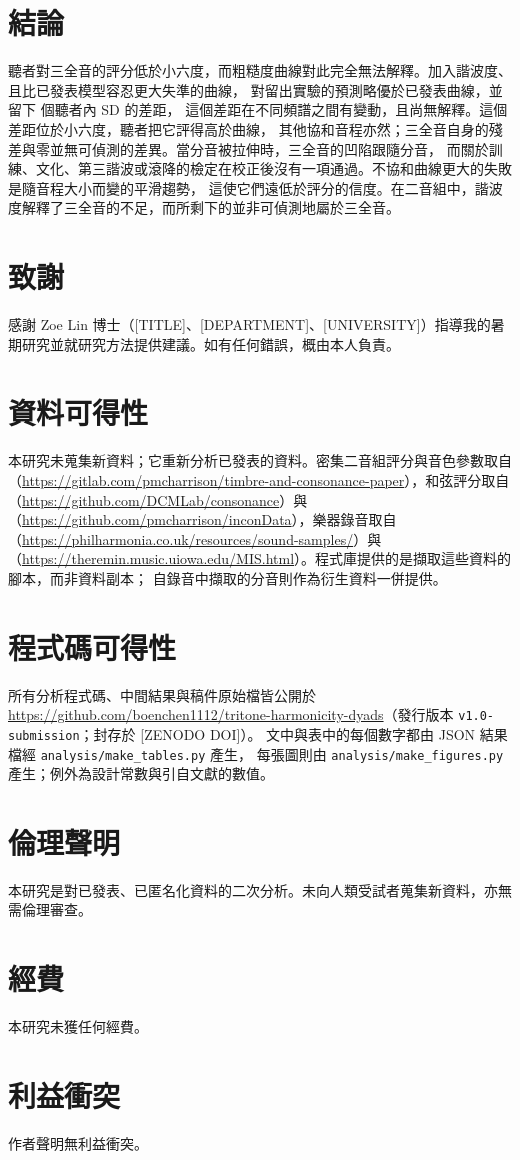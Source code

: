 \documentclass[11pt,a4paper]{article}
\begin{document}
\section{結論}
聽者對三全音的評分低於小六度，而粗糙度曲線對此完全無法解釋。加入諧波度、且比已發表模型容忍更大失準的曲線，
對留出實驗的預測略優於已發表曲線，並留下 \primGap{} 個聽者內 SD \primGapCI{} 的差距，
這個差距在不同頻譜之間有變動，且尚無解釋。這個差距位於小六度，聽者把它評得高於曲線，
其他協和音程亦然；三全音自身的殘差與零並無可偵測的差異。當分音被拉伸時，三全音的凹陷跟隨分音，
而關於訓練、文化、第三諧波或滾降的檢定在校正後沒有一項通過。不協和曲線更大的失敗是隨音程大小而變的平滑趨勢，
這使它們遠低於評分的信度。在二音組中，諧波度解釋了三全音的不足，而所剩下的並非可偵測地屬於三全音。

\section*{致謝}
感謝 Zoe Lin 博士（[TITLE]、[DEPARTMENT]、[UNIVERSITY]）指導我的暑期研究並就研究方法提供建議。如有任何錯誤，概由本人負責。

\section*{資料可得性}
本研究未蒐集新資料；它重新分析已發表的資料。密集二音組評分與音色參數取自 \citet{marjieh2024code}
（\url{https://gitlab.com/pmcharrison/timbre-and-consonance-paper}），和弦評分取自
\citet{dcmlab}（\url{https://github.com/DCMLab/consonance}）與 \citet{incondata}
（\url{https://github.com/pmcharrison/inconData}），樂器錄音取自
\citet{philharmonia}（\url{https://philharmonia.co.uk/resources/sound-samples/}）與
\citet{iowamis}（\url{https://theremin.music.uiowa.edu/MIS.html}）。程式庫提供的是擷取這些資料的腳本，而非資料副本；
自錄音中擷取的分音則作為衍生資料一併提供。

\section*{程式碼可得性}
所有分析程式碼、中間結果與稿件原始檔皆公開於
\url{https://github.com/boenchen1112/tritone-harmonicity-dyads}（發行版本 \texttt{v1.0-submission}；封存於 [ZENODO DOI]）。
文中與表中的每個數字都由 JSON 結果檔經 \texttt{analysis/make\_tables.py} 產生，
每張圖則由 \texttt{analysis/make\_figures.py} 產生；例外為設計常數與引自文獻的數值。

\section*{倫理聲明}
本研究是對已發表、已匿名化資料的二次分析。未向人類受試者蒐集新資料，亦無需倫理審查。

\section*{經費}
本研究未獲任何經費。

\section*{利益衝突}
作者聲明無利益衝突。


\end{document}
